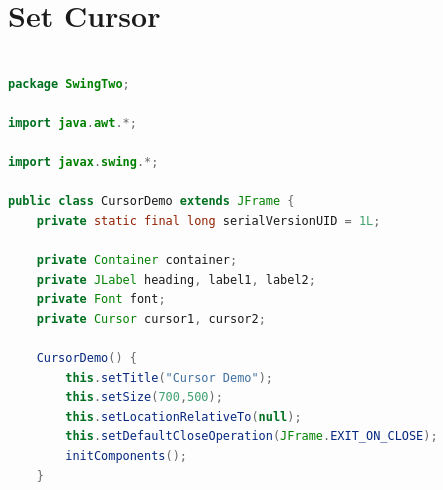 \newpage
\section{Set Cursor}

\begin{frame}



\begin{lstlisting}[language=java]

package SwingTwo;

import java.awt.*;

import javax.swing.*;

public class CursorDemo extends JFrame {
	private static final long serialVersionUID = 1L;
	
	private Container container;
	private JLabel heading, label1, label2;
	private Font font;
	private Cursor cursor1, cursor2;
	
	CursorDemo() {
		this.setTitle("Cursor Demo");
		this.setSize(700,500);
		this.setLocationRelativeTo(null);
		this.setDefaultCloseOperation(JFrame.EXIT_ON_CLOSE);
		initComponents();
	}
	

\end{lstlisting}
\end{frame}
